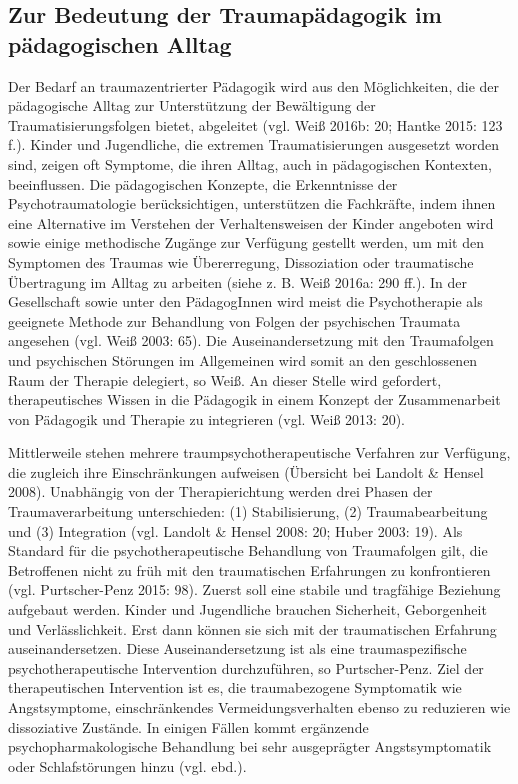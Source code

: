 \subsection{Zur Bedeutung der Traumapädagogik im pädagogischen Alltag}
Der Bedarf an traumazentrierter Pädagogik wird aus den Möglichkeiten, die der pädagogische Alltag zur Unterstützung der Bewältigung der Traumatisierungsfolgen bietet, abgeleitet (vgl. Weiß 2016b: 20; Hantke 2015: 123 f.). Kinder und Jugendliche, die extremen Traumatisierungen ausgesetzt worden sind, zeigen oft Symptome, die ihren Alltag, auch in pädagogischen Kontexten, beeinflussen. Die pädagogischen Konzepte, die Erkenntnisse der Psychotraumatologie berücksichtigen, unterstützen die Fachkräfte, indem ihnen eine Alternative im Verstehen der Verhaltensweisen der Kinder angeboten wird sowie einige methodische Zugänge zur Verfügung gestellt werden, um mit den Symptomen des Traumas wie Übererregung, Dissoziation oder traumatische Übertragung im Alltag zu arbeiten (siehe z. B. Weiß 2016a: 290 ff.). In der Gesellschaft sowie unter den PädagogInnen wird meist die Psychotherapie als geeignete Methode zur Behandlung von Folgen der psychischen Traumata angesehen (vgl. Weiß 2003: 65). Die Auseinandersetzung mit den Traumafolgen und psychischen Störungen im Allgemeinen wird somit an den geschlossenen Raum der Therapie delegiert, so Weiß. An dieser Stelle wird gefordert, therapeutisches Wissen in die P{\"a}dagogik in einem Konzept der Zusammenarbeit von P{\"a}dagogik und Therapie zu integrieren (vgl. Weiß 2013: 20).

Mittlerweile stehen mehrere traumpsychotherapeutische Verfahren zur Verfügung, die zugleich ihre Einschränkungen aufweisen (Übersicht bei Landolt \& Hensel 2008). Unabhängig von der Therapierichtung werden drei Phasen der Traumaverarbeitung unterschieden: (1) Stabilisierung, (2) Traumabearbeitung und (3) Integration (vgl. Landolt \& Hensel 2008: 20; Huber 2003: 19). Als Standard für die psychotherapeutische Behandlung von Traumafolgen gilt, die Betroffenen nicht zu früh mit den traumatischen Erfahrungen zu konfrontieren (vgl. Purtscher-Penz 2015: 98). Zuerst soll eine stabile und tragfähige Beziehung aufgebaut werden. Kinder und Jugendliche brauchen Sicherheit, Geborgenheit und Verlässlichkeit. Erst dann können sie sich mit der traumatischen Erfahrung auseinandersetzen. Diese Auseinandersetzung ist als eine traumaspezifische psychotherapeutische Intervention durchzuführen, so Purtscher-Penz. Ziel der therapeutischen Intervention ist es, die traumabezogene Symptomatik wie Angstsymptome, einschränkendes Vermeidungsverhalten ebenso zu reduzieren wie dissoziative Zustände. In einigen Fällen kommt ergänzende psychopharmakologische Behandlung bei sehr ausgeprägter Angstsymptomatik oder Schlafstörungen hinzu (vgl. ebd.).  

